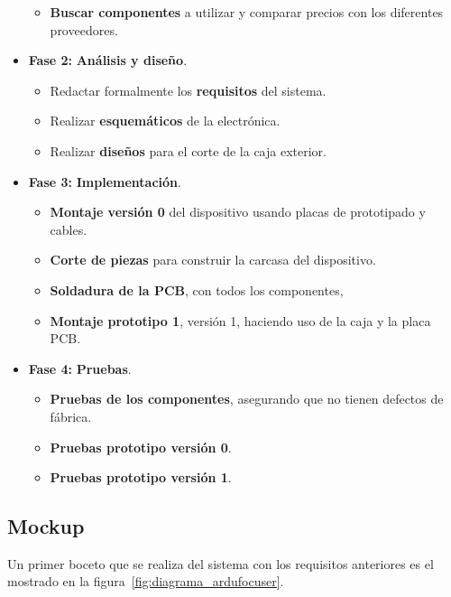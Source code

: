 \begin{itemize}
\begin{itemize}
		\item \textbf{Buscar componentes} a utilizar y comparar precios con los diferentes proveedores.
	\end{itemize}
	\item \textbf{Fase 2:} \textbf{Análisis y diseño}.
	\begin{itemize}
		\item Redactar formalmente los \textbf{requisitos} del sistema. 
		\item Realizar \textbf{esquemáticos} de la electrónica. 
		\item Realizar \textbf{diseños} para el corte de la caja exterior.
	\end{itemize}
	\item \textbf{Fase 3:} \textbf{Implementación}.
	\begin{itemize}
		\item \textbf{Montaje versión 0} del dispositivo usando placas de prototipado y cables.		
		\item \textbf{Corte de piezas} para construir la carcasa del dispositivo. 
		\item \textbf{Soldadura de la PCB}, con todos los componentes, 
		\item \textbf{Montaje prototipo 1}, versión 1, haciendo uso de la caja y la placa PCB. 
	\end{itemize}
	\item \textbf{Fase 4:} \textbf{Pruebas}.
	\begin{itemize}
		\item \textbf{Pruebas de los componentes}, asegurando que no tienen defectos de fábrica.
		\item \textbf{Pruebas prototipo versión 0}.
		\item \textbf{Pruebas prototipo versión 1}.
	\end{itemize} 
\end{itemize}


\subsection{Mockup}


Un primer boceto que se realiza del sistema con los requisitos anteriores es el mostrado en la figura~\ref{fig:diagrama_ardufocuser}.

